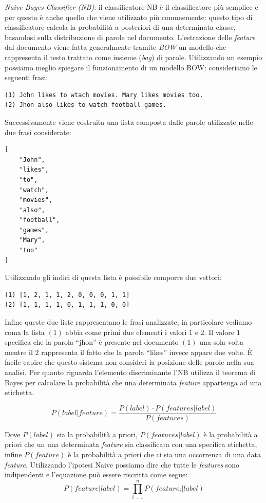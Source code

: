 \documentclass[a4paper,12pt,openright,twoside]{report}
\theoremstyle{definition}
\begin{document}
\emph{Naive Bayes Classifier (NB)}: il classificatore NB è il classificatore più semplice
e per questo è anche quello che viene utilizzato più comunemente: questo tipo di classificatore calcola
la probabilità a posteriori di una determinata classe, basandosi sulla distribuzione
di parole nel documento. L'estrazione delle \emph{feature} dal documento viene fatta
generalmente 
tramite \emph{BOW} un modello che rappresenta il testo trattato come insieme (\emph{bag}) di parole.
Utilizzando un esempio possiamo meglio spiegare il funzionamento di un modello BOW: consideriamo le
seguenti frasi:
\begin{verbatim}
(1) John likes to wtach movies. Mary likes movies too.
(2) Jhon also likes to watch football games.
\end{verbatim}
Successivamente viene costruita una lista composta dalle parole utilizzate nelle due frasi considerate:
\begin{verbatim}
[
    "John",
    "likes",
    "to",
    "watch",
    "movies",
    "also",
    "football",
    "games",
    "Mary",
    "too"
]
\end{verbatim}
Utilizzando gli indici di questa lista è possibile comporre due vettori:
\begin{verbatim}
(1) [1, 2, 1, 1, 2, 0, 0, 0, 1, 1]
(2) [1, 1, 1, 1, 0, 1, 1, 1, 0, 0]
\end{verbatim}
Infine queste due liste rappresentano le frasi analizzate, in particolare vediamo coma la
lista $(1)$ abbia come primi due elementi i valori $1$ e $2$. Il valore $1$ specifica che la parola
``jhon'' è presente nel documento $(1)$ una sola volta mentre il $2$ rappresenta il fatto che 
la parola ``likes'' invece appare due volte.
\`E facile capire che questo sistema non consideri la posizione delle parole nella sua analisi.
Per quanto riguarda l'elemento discriminante l'NB utilizza il
teorema di Bayes per calcolare la probabilità che una determinata \emph{feature}
appartenga ad una etichetta.

\begin{equation}
	P(label|feature)=\frac{P(label)\cdot{}P(features|label)}{P(features)}
	\label{Bayes}
\end{equation}

Dove $P(label)$ sia la probabilità a priori, $P(features|label)$ è
la probabilità a priori che un una determinata \emph{feature} sia
classificata con una specifica etichetta, infine $P(feature)$
è la probabilità a priori che ci sia una occorrenza di una data
\emph{feature}. Utilizzando l'ipotesi Naive possiamo dire che tutte le \emph{features} sono indipendenti
e l'equazione può essere riscritta come segue:
\begin{equation}
	P(feature|label)=\prod_{i=1}^n P(feature_i|label)
	\label{Naive Bayes}
\end{equation}
\end{document}
